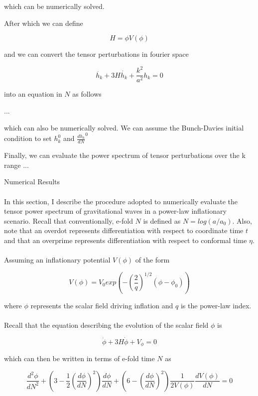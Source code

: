 \documentclass[12pt, a4paper]{report}
\begin{document}
which can be numerically solved.

After which we can define

$$H = \phi V(\phi)$$

and we can convert the tensor perturbations in fourier space

$$\ddot{h_k} + 3H\dot{h_k} + \frac{k^2}{a^2}h_k = 0$$

into an equation in $N$ as follows 

...

which can also be numerically solved. We can assume the Bunch-Davies initial condition to set $h_k^0$ and $\frac{dh_k}{dN}^0$

Finally, we can evaluate the power spectrum of tensor perturbations over the k range ... 


{\noindent \Large{Numerical Results}}

\paragraph{} In this section, I describe the procedure adopted to numerically evaluate the tensor power spectrum of gravitational waves in a power-law inflationary scenario. Recall that conventionally, e-fold $N$ is defined as $N = log(a/a_0)$. Also, note that an overdot represents differentiation with respect to coordinate time $t$ and that an overprime represents differentiation with respect to conformal time $\eta$.

\paragraph{} Assuming an inflationary potential $V(\phi)$ of the form

$$V(\phi) = V_0 exp(-(\frac{2}{q})^{1/2}(\phi - \phi_0))$$

\noindent where $\phi$ represents the scalar field driving inflation and $q$ is the power-law index.

\paragraph*{} Recall that the equation describing the evolution of the scalar field $\phi$ is

$$\ddot{\phi} + 3H\dot{\phi} + V_{\phi} = 0$$

\noindent which can then be written in terms of e-fold time $N$ as

$$\frac{d^2\phi}{dN^2} + (3 - \frac{1}{2}(\frac{d\phi}{dN})^2)\frac{d\phi}{dN} + (6 - (\frac{d\phi}{dN})^2)\frac{1}{2V(\phi)}\frac{dV(\phi)}{dN} = 0$$
\end{document}
